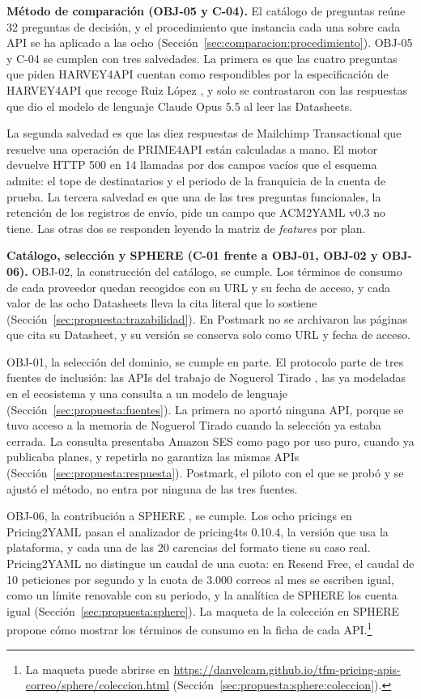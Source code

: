 \textbf{Método de comparación (OBJ-05 y C-04).}
El catálogo de preguntas reúne 32 preguntas de decisión, y el procedimiento que instancia cada una sobre cada API se ha aplicado a las ocho (Sección~\ref{sec:comparacion:procedimiento}).
OBJ-05 y C-04 se cumplen con tres salvedades.
La primera es que las cuatro preguntas que piden HARVEY4API cuentan como respondibles por la especificación de HARVEY4API que recoge Ruiz López \citep{ruizlopez2026tfm}, y solo se contrastaron con las respuestas que dio el modelo de lenguaje Claude Opus 5.5 al leer las Datasheets.

La segunda salvedad es que las diez respuestas de Mailchimp Transactional que resuelve una operación de PRIME4API están calculadas a mano.
El motor devuelve HTTP 500 en 14 llamadas por dos campos vacíos que el esquema admite: el tope de destinatarios y el periodo de la franquicia de la cuenta de prueba.
La tercera salvedad es que una de las tres preguntas funcionales, la retención de los registros de envío, pide un campo que ACM2YAML v0.3 no tiene.
Las otras dos se responden leyendo la matriz de \textit{features} por plan.

\textbf{Catálogo, selección y SPHERE (C-01 frente a OBJ-01, OBJ-02 y OBJ-06).}
OBJ-02, la construcción del catálogo, se cumple.
Los términos de consumo de cada proveedor quedan recogidos con su URL y su fecha de acceso, y cada valor de las ocho Datasheets lleva la cita literal que lo sostiene (Sección~\ref{sec:propuesta:trazabilidad}).
En Postmark no se archivaron las páginas que cita su Datasheet, y su versión se conserva solo como URL y fecha de acceso.

OBJ-01, la selección del dominio, se cumple en parte.
El protocolo parte de tres fuentes de inclusión: las APIs del trabajo de Noguerol Tirado \citep{noguerol2025tfm}, las ya modeladas en el ecosistema y una consulta a un modelo de lenguaje (Sección~\ref{sec:propuesta:fuentes}).
La primera no aportó ninguna API, porque se tuvo acceso a la memoria de Noguerol Tirado cuando la selección ya estaba cerrada.
La consulta presentaba Amazon SES como pago por uso puro, cuando ya publicaba planes, y repetirla no garantiza las mismas APIs (Sección~\ref{sec:propuesta:respuesta}).
Postmark, el piloto con el que se probó y se ajustó el método, no entra por ninguna de las tres fuentes.

OBJ-06, la contribución a SPHERE \citep{sphere}, se cumple.
Los ocho pricings en Pricing2YAML pasan el analizador de pricing4ts 0.10.4, la versión que usa la plataforma, y cada una de las 20 carencias del formato tiene su caso real.
Pricing2YAML no distingue un caudal de una cuota: en Resend Free, el caudal de 10 peticiones por segundo y la cuota de 3.000 correos al mes se escriben igual, como un límite renovable con su periodo, y la analítica de SPHERE los cuenta igual (Sección~\ref{sec:propuesta:sphere}).
La maqueta de la colección en SPHERE propone cómo mostrar los términos de consumo en la ficha de cada API.\footnote{La maqueta puede abrirse en \url{https://danvelcam.github.io/tfm-pricing-apis-correo/sphere/coleccion.html} (Sección~\ref{sec:propuesta:sphere:coleccion}).}


